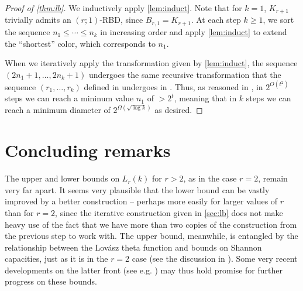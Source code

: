 \documentclass[10pt,a4paper]{amsart}
\numberwithin{theorem}{section}
\renewcommand{\le}{\leqslant}
\renewcommand{\ge}{\geqslant}
\begin{document}
\begin{proof}[Proof of \cref{thm:lb}]
We inductively apply \cref{lem:induct}. Note that for $k=1$, $K_{r+1}$ trivially admits an $(r;1)$-RBD, since $B_{r,1}=K_{r+1}$. At each step $k\ge 1$, we sort the sequence $n_1\le \cdots\le n_k$ in increasing order and apply \cref{lem:induct} to extend the ``shortest'' color, which corresponds to $n_1$. 

When we iteratively apply the transformation given by \cref{lem:induct}, the sequence $(2n_1+1,\dots,2n_k+1)$ undergoes the same recursive transformation that the sequence $(r_1,\dots,r_k)$ defined in \cite{DayJohnson2017MulticolourRamseyOddCycles} undergoes in \cite[Lemma~5]{DayJohnson2017MulticolourRamseyOddCycles}. Thus, as reasoned in \cite[Corollary~6]{DayJohnson2017MulticolourRamseyOddCycles}, in $2^{O(t^2)}$ steps we can reach a mininum value $n_1$ of $>2^t$, meaning that in $k$ steps we can reach a minimum diameter of $2^{\Omega(\sqrt{\log k})}$ as desired.

\end{proof}


\section{Concluding remarks}
\label{sec:conclusion}
The upper and lower bounds on $L_r(k)$ for $r>2$, as in the case $r=2$, remain very far apart. It seems very plausible that the lower bound can be vastly improved by a better construction -- perhaps more easily for larger values of $r$ than for $r=2$, since the iterative construction given in \cref{sec:lb} does not make heavy use of the fact that we have more than two copies of the construction from the previous step to work with. The upper bound, meanwhile, is entangled by the relationship between the Lov\'asz theta function and bounds on Shannon capacities, just as it is in the $r=2$ case (see the discussion in \cite[Section~3]{JanzerYip2026ShortMonochromaticOddCycles}). Some very recent developments on the latter front (see e.g. \cite{itty2026improved}) may thus hold promise for further progress on these bounds.
\end{document}
